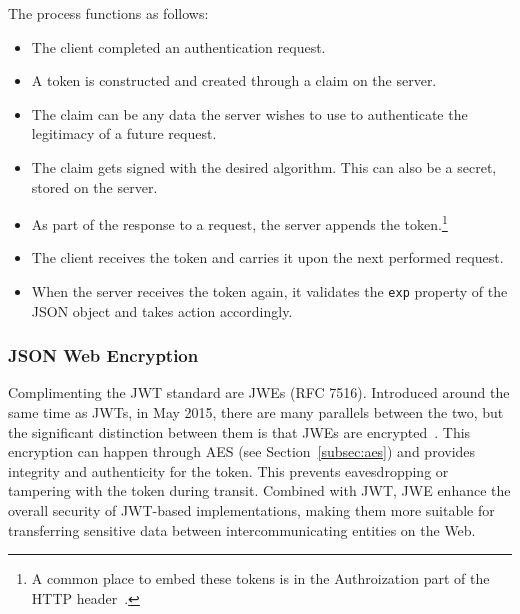 The process functions as follows:
\begin{itemize}
  \item The client completed an authentication request.
  \item A token is constructed and created through a claim on the server.
  \item The claim can be any data the server wishes to use to authenticate the
  legitimacy of a future request.
  \item The claim gets signed with the desired algorithm.
  This can also be a secret, stored on the server.
  \item As part of the response to a request, the server appends the token.\footnote{
    A common place to embed these tokens is in the Authroization part of the
    HTTP header~\cite{RFC7519}.
  }
  \item The client receives the token and carries it upon the next performed
  request.
  \item When the server receives the token again, it validates the \texttt{exp}
  property of the JSON object and takes action accordingly.
\end{itemize}

\subsubsection{JSON Web Encryption}
Complimenting the JWT standard are JWEs (RFC 7516).
Introduced around the same time as JWTs, in May 2015, there are many parallels
between the two, but the significant distinction between them is that JWEs are
encrypted~\cite{rfc7516}.
This encryption can happen through AES (see Section~\ref{subsec:aes}) and
provides integrity and authenticity for the token.
This prevents eavesdropping or tampering with the token during transit.
Combined with JWT, JWE enhance the overall security of JWT-based implementations,
making them more suitable for transferring sensitive data between
intercommunicating entities on the Web.
